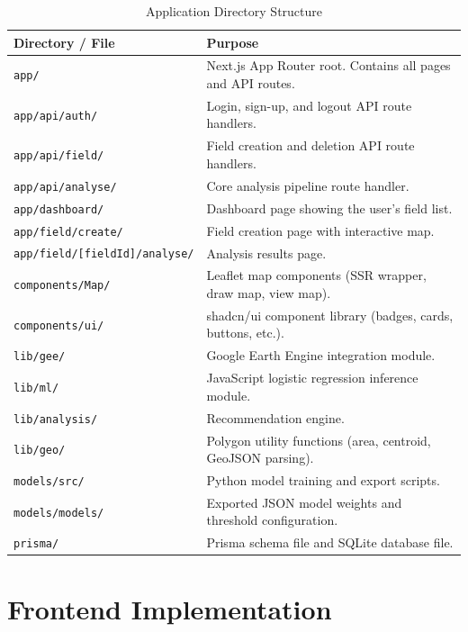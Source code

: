 \begin{table}[H]
  \centering
  \caption{Application Directory Structure}
  \label{tab:structure}
  \begin{tabularx}{\textwidth}{p{4.5cm} X}
    \toprule
    \textbf{Directory / File} & \textbf{Purpose} \\
    \midrule
    \texttt{app/}                   & Next.js App Router root. Contains all pages and API routes. \\
    \texttt{app/api/auth/}          & Login, sign-up, and logout API route handlers. \\
    \texttt{app/api/field/}         & Field creation and deletion API route handlers. \\
    \texttt{app/api/analyse/}       & Core analysis pipeline route handler. \\
    \texttt{app/dashboard/}         & Dashboard page showing the user's field list. \\
    \texttt{app/field/create/}      & Field creation page with interactive map. \\
    \texttt{app/field/[fieldId]/analyse/} & Analysis results page. \\
    \texttt{components/Map/}        & Leaflet map components (SSR wrapper, draw map, view map). \\
    \texttt{components/ui/}         & shadcn/ui component library (badges, cards, buttons, etc.). \\
    \texttt{lib/gee/}               & Google Earth Engine integration module. \\
    \texttt{lib/ml/}                & JavaScript logistic regression inference module. \\
    \texttt{lib/analysis/}          & Recommendation engine. \\
    \texttt{lib/geo/}               & Polygon utility functions (area, centroid, GeoJSON parsing). \\
    \texttt{models/src/}            & Python model training and export scripts. \\
    \texttt{models/models/}         & Exported JSON model weights and threshold configuration. \\
    \texttt{prisma/}                & Prisma schema file and SQLite database file. \\
    \bottomrule
  \end{tabularx}
\end{table}

\section{Frontend Implementation}

